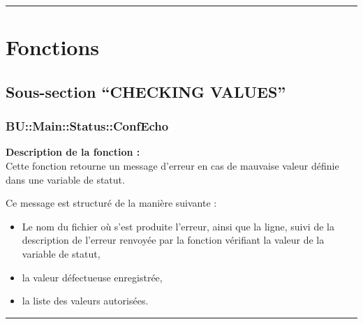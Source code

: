 \documentclass[a4paper,10pt]{article}
\begin{document}

\color{red}\par\noindent\rule{\textwidth}{0.4pt}\color{white}

\color{red}
\section{Fonctions}\color{white}

\color{green}
\subsection{Sous-section ``CHECKING VALUES''}

\color{blue}
\subsubsection{\color{mauve}BU::Main::Status::ConfEcho}\color{white}

\begin{justify}
\textbf{Description de la fonction :}\\[1\baselineskip]
    Cette fonction retourne un message d'erreur en cas de mauvaise valeur définie dans une variable de statut.
\end{justify}

\begin{justify}
   	Ce message est structuré de la manière suivante :

   	\begin{itemize}
   		\item Le nom du fichier où s'est produite l'erreur, ainsi que la ligne, suivi de la description de l'erreur renvoyée par la fonction vérifiant la valeur de la variable de statut,\setlength{\parskip}{1em}

   		\item la valeur défectueuse enregistrée,

   		\item la liste des valeurs autorisées.
   	\end{itemize}
\end{justify}

\par\noindent\rule{\textwidth}{0.4pt}
\end{document}
